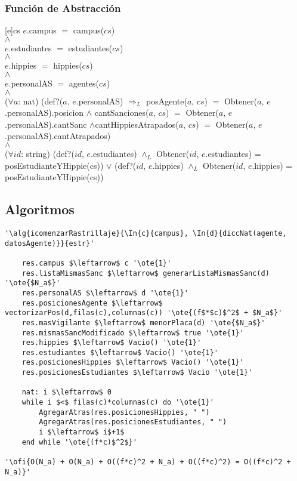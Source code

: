 \pagebreak

\subsubsection{Función de Abstracción}
[e]{cs}{
$e$.campus $=$ campus($cs$) 
\\
$\land$
\\
$e$.estudiantes $=$ estudiantes($cs$)
\\
$\land$
\\
$e$.hippies $=$ hippies($cs$)
\\
$\land$
\\
$e$.personalAS $=$ agentes($cs$)
\\
$\land$
\\
($\forall a$: nat) (def?($a$, $e$.personalAS) $\Rightarrow_L$ posAgente($a$, $cs$) $=$ Obtener($a$, $e$.personalAS).posicion $\land$ cantSanciones($a$, $cs$) $=$ Obtener($a$, $e$.personalAS).cantSanc $\land$cantHippiesAtrapados($a$, $cs$) $=$ Obtener($a$, $e$.personalAS).cantAtrapados)
\\
$\land$
\\
($\forall id$: string) (def?($id$, $e$.estudiantes) $\land_L$ Obtener($id$, $e$.estudiantes) = posEstudianteYHippie(cs)) $\lor$ (def?($id$, $e$.hippies) $\land_L$ Obtener($id$, $e$.hippies) = posEstudianteYHippie(cs))
}

\subsection{Algoritmos}

\lstset{style=alg}

\begin{lstlisting}[mathescape]
'\alg{icomenzarRastrillaje}{\In{c}{campus}, \In{d}{diccNat(agente, datosAgente)}}{estr}' 

	res.campus $\leftarrow$ c '\ote{1}'
	res.listaMismasSanc $\leftarrow$ generarListaMismasSanc(d) '\ote{$N_a$}'
	res.personalAS $\leftarrow$ d '\ote{1}'
	res.posicionesAgente $\leftarrow$ vectorizarPos(d,filas(c),columnas(c)) '\ote{(f$*$c)$^2$ + $N_a$}'
	res.masVigilante $\leftarrow$ menorPlaca(d) '\ote{$N_a$}'
	res.mismasSancModificado $\leftarrow$ true '\ote{1}'
	res.hippies $\leftarrow$ Vacio() '\ote{1}'
	res.estudiantes $\leftarrow$ Vacio() '\ote{1}'
	res.posicionesHippies $\leftarrow$ Vacio() '\ote{1}'
	res.posicionesEstudiantes $\leftarrow$ Vacio '\ote{1}'
	
	nat: i $\leftarrow$ 0
	while i $<$ filas(c)*columnas(c) do '\ote{1}'
		AgregarAtras(res.posicionesHippies, " ")
		AgregarAtras(res.posicionesEstudiantes, " ")
		i $\leftarrow$ i$+1$
	end while '\ote{(f*c)$^2$}'

'\ofi{O(N_a) + O(N_a) + O((f*c)^2 + N_a) + O((f*c)^2) = O((f*c)^2 + N_a)}'
\end{lstlisting}

